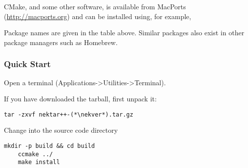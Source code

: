 \begin{tipbox}
CMake, and some other software, is available from MacPorts
(\url{http://macports.org}) and can be installed using, for example,

\noindent\usebox\installationOSXMacPortsTip

Package names are given in the table above. Similar packages also exist in other
package managers such as Homebrew.
\end{tipbox}


\subsubsection{Quick Start}
Open a terminal (Applications->Utilities->Terminal).

If you have downloaded the tarball, first unpack it:
\begin{lstlisting}[style=BashInputStyle]
tar -zxvf nektar++-(*\nekver*).tar.gz
\end{lstlisting}
Change into the  source code directory
\begin{lstlisting}[style=BashInputStyle]
    mkdir -p build && cd build
    ccmake ../
    make install
\end{lstlisting}

